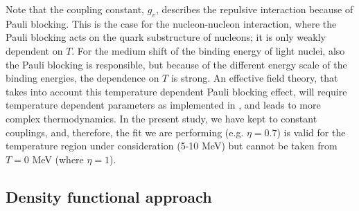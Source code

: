 \documentclass[aps,prc,nofootinbib,twocolumn,showpacs]{revtex4-1}
\begin{document}
Note that the coupling constant, $g_v$, describes the repulsive interaction because of Pauli blocking. This is the case for the nucleon-nucleon interaction, where the Pauli blocking acts on the quark substructure of nucleons; it is only weakly dependent on $T$.
For the medium shift of the binding energy of light nuclei, also the Pauli blocking is responsible, but because of the different energy scale
of the binding energies, the dependence on $T$ is strong.
 An effective field theory, that takes  into account this temperature dependent Pauli
blocking effect,  will  require temperature dependent
parameters as implemented in \cite{typel10}, and  leads to
 more complex thermodynamics. In the present
study, we have kept to constant couplings, and, therefore, 
the fit we are performing (e.g. $\eta =0.7$)
 is valid for the temperature region under consideration (5-10 MeV)
 but cannot be taken from $T = 0$ MeV (where $\eta = 1$). 






\subsection{Density functional approach}
\end{document}

